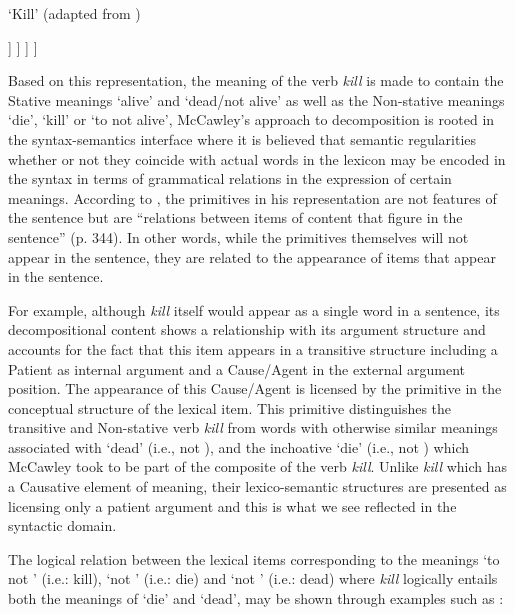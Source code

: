 \ea
\label{ex:4:11}
`Kill' (adapted from \citealt[73]{McCawley1968})\\
\begin{forest}
[S
  [\CAUSE] [x,xshift=-1.2cm] [S
	    [\BECOME] [S
			[not] [S
				[alive] [x]
				]
			]
	  ]
]
\end{forest}
\z

Based on this representation, the meaning of the verb \textit{kill} is made
to contain the Stative meanings `alive' and `dead\slash not alive' as well
as the Non-stative meanings `die', `kill' or `\CAUSE to \BECOME not
alive',  McCawley’s approach to decomposition is rooted in the
syntax-semantics interface where it is believed that semantic
regularities whether or not they coincide with actual words in the
lexicon may be encoded in the syntax in terms of grammatical relations
in the expression of certain meanings.  According to
\citet{McCawley1973}, the primitives in his representation are not
features of the sentence but are “relations between items of content
that figure in the sentence” (p. 344).  In other words, while the
primitives themselves will not appear in the sentence, they are
related to the appearance of items that appear in the sentence.

For example, although \textit{kill} itself would appear as a single word in a 
sentence, its decompositional content shows a relationship with its
argument structure and accounts for the fact that this item appears in
a transitive structure including a Patient as internal argument and a
Cause\slash Agent in the external argument position.  The appearance of this
Cause\slash Agent is licensed by the \CAUSE primitive in the conceptual
structure of the lexical item.  This primitive distinguishes the
transitive and Non-stative verb \textit{kill} from words with otherwise
similar meanings associated with `dead' (i.e., not \ALIVE), and the
inchoative `die' (i.e., \BECOME not \ALIVE) which McCawley took to be
part of the composite of the verb \textit{kill}.  Unlike \textit{kill} which has a
Causative element of meaning, their lexico-semantic structures are
presented as licensing only a patient argument and this is what we see
reflected in the syntactic domain.

The logical relation between the lexical items corresponding to the
meanings `\CAUSE to \BECOME not \ALIVE' (i.e.: kill), `\BECOME not \ALIVE'
(i.e.: die) and `not \ALIVE' (i.e.: dead) where \textit{kill} logically
entails both the meanings of `die' and `dead', may be shown through
examples such as :

